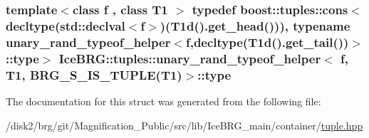 \subsubsection[{type}]{\setlength{\rightskip}{0pt plus 5cm}template$<$class f , class T1 $>$ typedef boost\+::tuples\+::cons$<$decltype(std\+::declval$<$f$>$)({\bf T1d}().get\+\_\+head())), typename {\bf unary\+\_\+rand\+\_\+typeof\+\_\+helper}$<$f,decltype({\bf T1d}().get\+\_\+tail())$>$\+::{\bf type}$>$ {\bf Ice\+B\+R\+G\+::tuples\+::unary\+\_\+rand\+\_\+typeof\+\_\+helper}$<$ f, T1, {\bf B\+R\+G\+\_\+\+S\+\_\+\+I\+S\+\_\+\+T\+U\+P\+L\+E}(T1)$>$\+::{\bf type}}\label{structIceBRG_1_1tuples_1_1unary__rand__typeof__helper_3_01f_00_01T1_00_01BRG__S__IS__TUPLE_07T1_08_4_a1936e83b3ef0820a319846b7c3f3b9a6}


The documentation for this struct was generated from the following file\+:\begin{DoxyCompactItemize}
\item 
/disk2/brg/git/\+Magnification\+\_\+\+Public/src/lib/\+Ice\+B\+R\+G\+\_\+main/container/\hyperlink{tuple_8hpp}{tuple.\+hpp}\end{DoxyCompactItemize}
